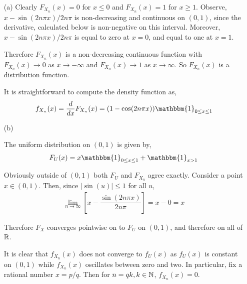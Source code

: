 \documentclass[10pt]{article}
\begin{document}
\begin{solution}[Solution]
\begin{enumerate}
    \item[(a)] Clearly \( F_{X_n}(x) = 0 \) for \( x\leq 0 \) and \( F_{X_n}(x) = 1 \) for \( x\geq 1 \). 
        Observe, \( x-\sin(2n\pi x)/2n\pi \) is non-decreasing and continuous on \( (0,1) \), since the derivative, calculated below is non-negative on this interval. Moreover, \( x-\sin(2n\pi x)/2n\pi \) is equal to zero at \( x=0 \), and equal to one at \( x=1 \).
        
        Therefore \( F_{X_n}(x) \) is a non-decreasing continuous function with \( F_{X_n}(x)\to 0 \) as \( x\to-\infty \) and \( F_{X_n}(x)\to 1 \) as \( x\to\infty \). So \( F_{X_n}(x) \) is a distribution function.
        
        It is straightforward to compute the density function as,
        \begin{align*}
            f_{X_n}(x) = \dfrac{d}{dx}F_{X_n}(x) = (1-\cos(2n\pi x))\mathbbm{1}_{0\leq x\leq 1}
        \end{align*}
    \item[(b)]

        The uniform distribution on \( (0,1) \) is given by,
        \begin{align*}
            F_U(x) = x\mathbbm{1}_{0\leq x\leq 1}+\mathbbm{1}_{x>1}
        \end{align*}

        Obviously outside of \( (0,1) \) both \( F_U \) and \( F_{X_n} \) agree exactly. Consider a point \( x\in(0,1) \). Then, since \( |\sin(u)|\leq 1 \) for all \( u \),
        \begin{align*}
            \lim_{n\to\infty}\left[ x-\dfrac{\sin(2n \pi x)}{2n\pi}\right] = x-0 = x%
        \end{align*}

        Therefore \( F_X \) converges pointwise on to \( F_U \) on \( (0,1) \), and therefore on all of \( \mathbb{R} \).

        It is clear that \( f_{X_n}(x) \) does not converge to \( f_U(x) \) as \( f_U(x) \) is constant on \( (0,1) \) while \( f_{X_n}(x) \) oscillates between zero and two. In particular, fix a rational number \( x=p/q \). Then for \( n=qk, k\in\mathbb{N} \), \( f_{X_n}(x)=0 \). 



\end{enumerate} 
\end{solution}
    
\end{document}
